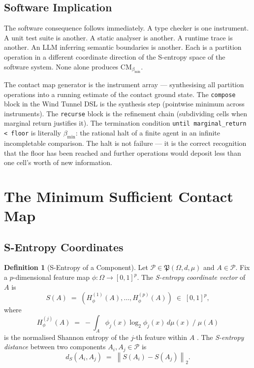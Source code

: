 \documentclass[12pt,a4paper,twocolumn]{article}
\theoremstyle{plain}
\theoremstyle{definition}
\newtheorem{definition}[theorem]{Definition}
\theoremstyle{remark}
\newcommand{\Part}{\mathcal{P}}
\newcommand{\CM}{\mathrm{CM}}
\newcommand{\bmin}{\beta_{\min}}
\newcommand{\Scoord}{S}
\newcommand{\dS}{d_S}
\newcommand{\CMbmin}{\CM_{\bmin}}
\begin{document}
\subsection{Software Implication}

The software consequence follows immediately.  A type checker is one
instrument.  A unit test suite is another.  A static analyser is another.
A runtime trace is another.  An LLM inferring semantic boundaries is another.
Each is a partition operation in a different coordinate direction of the
S-entropy space of the software system.  None alone produces $\CMbmin$.

The contact map generator is the instrument array --- synthesising all
partition operations into a running estimate of the contact ground state.
The \texttt{compose} block in the Wind Tunnel DSL is the synthesis step
(pointwise minimum across instruments).  The \texttt{recurse} block is the
refinement chain (subdividing cells when marginal return justifies it).  The
termination condition \texttt{until marginal\_return < floor} is literally
$\bmin$: the rational halt of a finite agent in an infinite incompletable
comparison.  The halt is not failure --- it is the correct recognition that
the floor has been reached and further operations would deposit less than one
cell's worth of new information.

\section{The Minimum Sufficient Contact Map}
\label{sec:mscm}

\subsection{S-Entropy Coordinates}

\begin{definition}[S-Entropy of a Component]
\label{def:s-entropy}
Let $\Part \in \mathfrak{P}(\Omega,d,\mu)$ and $A \in \Part$.  Fix a
$p$-dimensional feature map $\phi : \Omega \to [0,1]^p$.  The
\emph{S-entropy coordinate vector} of $A$ is
\begin{equation}
  \Scoord(A) \;=\; \left( H_\phi^{(1)}(A), \ldots, H_\phi^{(p)}(A) \right)
    \;\in\; [0,1]^p,
\end{equation}
where
\begin{equation}
  H_\phi^{(j)}(A) \;=\; -\int_A \phi_j(x) \log_2 \phi_j(x)\, d\mu(x)
    \;\bigg/\; \mu(A)
\end{equation}
is the normalised Shannon entropy of the $j$-th feature within $A$
\citep{shannon1948mathematical, cover2006elements}.  The \emph{S-entropy
distance} between two components $A_i, A_j \in \Part$ is
\begin{equation}
  \dS(A_i, A_j) \;=\; \left\|\Scoord(A_i) - \Scoord(A_j)\right\|_2.
\end{equation}
\end{definition}
\end{document}
